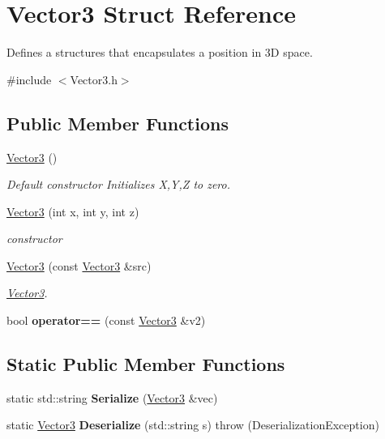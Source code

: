 \hypertarget{structVector3}{\section{Vector3 Struct Reference}
\label{structVector3}
}


Defines a structures that encapsulates a position in 3\-D space.  




{\ttfamily \#include $<$Vector3.\-h$>$}

\subsection*{Public Member Functions}
\begin{DoxyCompactItemize}
\item 
\hypertarget{structVector3_a0f49191f7e001e7f7ae1cb49522118b4}{\hyperlink{structVector3_a0f49191f7e001e7f7ae1cb49522118b4}{Vector3} ()}\label{structVector3_a0f49191f7e001e7f7ae1cb49522118b4}

\begin{DoxyCompactList}\small\item\em Default constructor Initializes X,Y,Z to zero. \end{DoxyCompactList}\item 
\hyperlink{structVector3_af7339592cdacffdfc39566133bd285d0}{Vector3} (int x, int y, int z)
\begin{DoxyCompactList}\small\item\em constructor \end{DoxyCompactList}\item 
\hyperlink{structVector3_a48b47d99e6445850a61e57eb850a5a4f}{Vector3} (const \hyperlink{structVector3}{Vector3} \&src)
\begin{DoxyCompactList}\small\item\em \hyperlink{structVector3}{Vector3}. \end{DoxyCompactList}\item 
\hypertarget{structVector3_a426560c251dee5150b4a951bbabd0a0f}{bool {\bfseries operator==} (const \hyperlink{structVector3}{Vector3} \&v2)}\label{structVector3_a426560c251dee5150b4a951bbabd0a0f}

\end{DoxyCompactItemize}
\subsection*{Static Public Member Functions}
\begin{DoxyCompactItemize}
\item 
\hypertarget{structVector3_a09da13e2a2ee2e5f24a44f9c6aae989c}{static std\-::string {\bfseries Serialize} (\hyperlink{structVector3}{Vector3} \&vec)}\label{structVector3_a09da13e2a2ee2e5f24a44f9c6aae989c}

\item 
\hypertarget{structVector3_aacc5770d95feb07b6415fa76efbab937}{static \hyperlink{structVector3}{Vector3} {\bfseries Deserialize} (std\-::string s)  throw (\-Deserialization\-Exception)}\label{structVector3_aacc5770d95feb07b6415fa76efbab937}

\end{DoxyCompactItemize}
